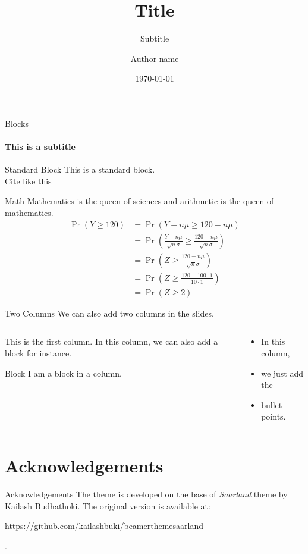 \documentclass[aspectratio=169]{beamer}
\author{Author name}
\title{Title}
\subtitle{Subtitle}
\institute{The Ohio State University}
\date{\today}
\begin{document}
\begin{frame}[plain]
	\titlepage
\end{frame}
	
\begin{frame}{Blocks}
	\framesubtitle{This is a subtitle}
	\begin{block}{Standard Block}
		This is a standard block. \\
		Cite like this \parencite{angrist_lifetime_1990}
	\end{block}
\end{frame}

\begin{frame}{Math}
	Mathematics is the queen of sciences and arithmetic is the queen of mathematics.
	\begin{align*}
		\Pr(Y \geq 120) &= \Pr\left(Y-n\mu \geq 120-n\mu \right)\\
		&= \Pr\left( \frac{Y-n\mu }{\sqrt{n}\sigma} \geq \frac{120-n\mu }{\sqrt{n}\sigma} \right)\\
		&=\Pr\left( Z \geq \frac{120-n\mu }{\sqrt{n}\sigma} \right)\\
		&=\Pr\left( Z \geq \frac{120-100 \cdot 1 }{10 \cdot 1} \right)\\
		&=\Pr\left( Z \geq 2\right)
	\end{align*}
\end{frame}

\begin{frame}{Two Columns}
	We can also add two columns in the slides.
	\begin{columns}[t]
		\begin{column}[T]{0.4\textwidth}
			This is the first column. In this column, we can also add a block for instance.
			\vspace{1em}
			\begin{block}{Block}
				I am a block in a column.
			\end{block}
		\end{column}
		\begin{column}[T]{0.4\textwidth}
			\begin{itemize}
				\item In this column,
				\item we just add the
				\item bullet points.
			\end{itemize}
		\end{column}
	\end{columns}
\end{frame}

\section{Acknowledgements}

\begin{frame}{Acknowledgements}
	The theme is developed on the base of \textsl{Saarland} theme by Kailash Budhathoki. The original version is available at:
	\begin{url}
		https://github.com/kailashbuki/beamerthemesaarland
	\end{url}.
\end{frame}
\end{document}

